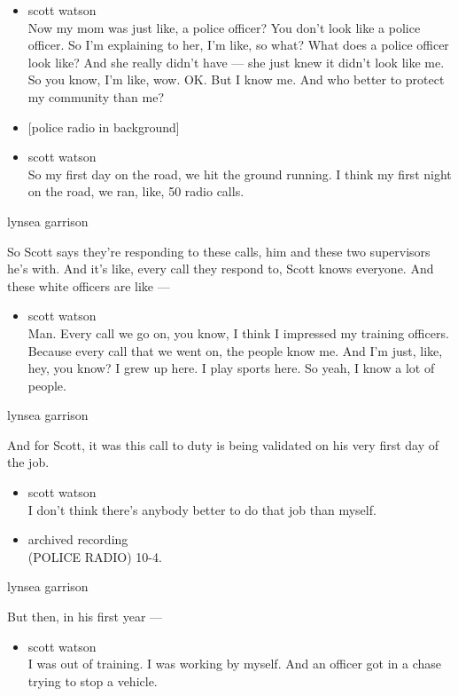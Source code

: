 \begin{itemize}
\item
  scott watson\\
  Now my mom was just like, a police officer? You don't look like a
  police officer. So I'm explaining to her, I'm like, so what? What does
  a police officer look like? And she really didn't have --- she just
  knew it didn't look like me. So you know, I'm like, wow. OK. But I
  know me. And who better to protect my community than me?
\item
  {[}police radio in background{]}
\item
  scott watson\\
  So my first day on the road, we hit the ground running. I think my
  first night on the road, we ran, like, 50 radio calls.
\end{itemize}

lynsea garrison

So Scott says they're responding to these calls, him and these two
supervisors he's with. And it's like, every call they respond to, Scott
knows everyone. And these white officers are like ---

\begin{itemize}
\tightlist
\item
  scott watson\\
  Man. Every call we go on, you know, I think I impressed my training
  officers. Because every call that we went on, the people know me. And
  I'm just, like, hey, you know? I grew up here. I play sports here. So
  yeah, I know a lot of people.
\end{itemize}

lynsea garrison

And for Scott, it was this call to duty is being validated on his very
first day of the job.

\begin{itemize}
\item
  scott watson\\
  I don't think there's anybody better to do that job than myself.
\item
  archived recording\\
  (POLICE RADIO) 10-4.
\end{itemize}

lynsea garrison

But then, in his first year ---

\begin{itemize}
\tightlist
\item
  scott watson\\
  I was out of training. I was working by myself. And an officer got in
  a chase trying to stop a vehicle.
\end{itemize}

